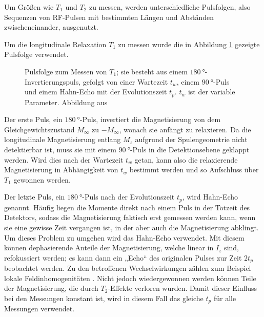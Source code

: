 Um Größen wie $T_1$ und $T_2$ zu messen, werden unterschiedliche Pulsfolgen, also Sequenzen von RF-Pulsen mit bestimmten Längen und Abständen zwischeneinander, ausgenutzt.

Um die longitudinale Relaxation $T_1$ zu messen wurde die in Abbildung \ref{fig:theo:pulsT1} gezeigte Pulsfolge verwendet.
\begin{figure}
	\begin{center}
		
	\end{center}
    \caption{Pulsfolge zum Messen von $T_1$; sie besteht aus einem $\SI{180}{\degree}$-Invertierungspuls, gefolgt von einer Wartezeit $t_w$, einem $\SI{90}{\degree}$-Puls und einem Hahn-Echo mit der Evolutionszeit $t_p$. $t_w$ ist der variable Parameter. Abbildung aus \cite{joachim_master}}\label{fig:theo:pulsT1}
\end{figure}

Der erste Puls, ein $\SI{180}{\degree}$-Puls, invertiert die Magnetisierung von dem Gleichgewichtszustand $M_\infty$ zu $-M_\infty$, wonach sie anfängt zu relaxieren. Da die longitudinale Magnetisierung entlang $M_z$ aufgrund der Spulengeometrie nicht detektierbar ist, muss sie mit einem $\SI{90}{\degree}$-Puls in die Detektionsebene geklappt werden. Wird dies nach der Wartezeit $t_w$ getan, kann also die relaxierende Magnetisierung in Abhängigkeit von $t_w$ bestimmt werden und so Aufschluss über $T_1$ gewonnen werden.

Der letzte Puls, ein $\SI{180}{\degree}$-Puls nach der Evolutionszeit $t_p$, wird Hahn-Echo genannt. Häufig liegen die Momente direkt nach einem Puls in der Totzeit des Detektors, sodass die Magnetisierung faktisch erst gemessen werden kann, wenn sie eine gewisse Zeit vergangen ist, in der aber auch die Magnetisierung abklingt. Um dieses Problem zu umgehen wird das Hahn-Echo verwendet. Mit diesem können dephasierende Anteile der Magnetisierung, welche linear in $I_z$ sind, refokussiert werden; es kann dann ein „Echo“ des originalen Pulses zur Zeit $2 t_p$ beobachtet werden. Zu den betroffenen Wechselwirkungen zählen zum Beispiel lokale Feldinhomogenitäten \cite[S.302]{levitt}. Nicht jedoch wiedergewonnen werden können Teile der Magnetisierung, die durch $T_2$-Effekte verloren wurden. Damit dieser Einfluss bei den Messungen konstant ist, wird in diesem Fall das gleiche $t_p$ für alle Messungen verwendet.

